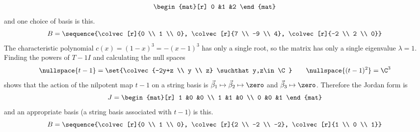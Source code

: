 \begin{exercises}
\begin{answer}
\begin{exparts}
\begin{equation*}
\begin{mat}[r]
                    0  &1  &2
                  \end{mat}
            \end{equation*}
            and one choice of basis is this.
            \begin{equation*}
              B=\sequence{\colvec[r]{0 \\ 1 \\ 0},
                          \colvec[r]{7 \\ -9 \\ 4},
                          \colvec[r]{-2 \\ 2 \\ 0}}
            \end{equation*}
        \partsitem The characteristic polynomial
            \( c(x)=(1-x)^3=-(x-1)^3 \) has only a single root,
            so the matrix has only a single eigenvalue $\lambda=1$.
            Finding the powers of $T-1I$ 
            and calculating the null spaces
            \begin{equation*}
               \nullspace{t-1}=\set{\colvec{-2y+z \\ y \\ z}
                                      \suchthat y,z\in\C} 
               \qquad
               \nullspace{(t-1)^2}=\C^3 
            \end{equation*}
            shows that the action of the nilpotent map $t-1$ on a string
            basis is
            $\vec{\beta}_1\mapsto\vec{\beta}_2\mapsto\zero$ and
            $\vec{\beta}_3\mapsto\zero$.
            Therefore the Jordan form is
            \begin{equation*}
                  J=
                  \begin{mat}[r]
                    1  &0  &0  \\
                    1  &1  &0  \\
                    0  &0  &1
                  \end{mat}
            \end{equation*}
            and an appropriate basis (a string basis associated with
            $t-1$) is this.
            \begin{equation*}
              B=\sequence{\colvec[r]{0 \\ 1 \\ 0},
                          \colvec[r]{2 \\ -2 \\ -2},
                          \colvec[r]{1 \\ 0 \\ 1}}

\end{equation*}
\end{exparts}
\end{answer}
\end{exercises}
